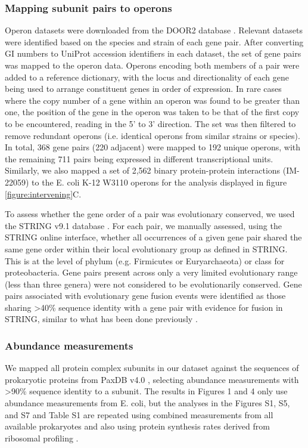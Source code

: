 \documentclass[a4paper,11pt,twoside,openright]{scrbook}
\begin{document}
\subsubsection{Mapping subunit pairs to operons}
Operon datasets were downloaded from the DOOR2 database \cite{Mao2014}. Relevant datasets were identified based on the species and strain of each gene pair. After converting GI numbers to UniProt accession identifiers in each dataset, the set of gene pairs was mapped to the operon data. Operons encoding both members of a pair were added to a reference dictionary, with the locus and directionality of each gene being used to arrange constituent genes in order of expression. In rare cases where the copy number of a gene within an operon was found to be greater than one, the position of the gene in the operon was taken to be that of the first copy to be encountered, reading in the 5' to 3' direction. The set was then filtered to remove redundant operons (i.e. identical operons from similar strains or species). In total, 368 gene pairs (220 adjacent) were mapped to 192 unique operons, with the remaining 711 pairs being expressed in different transcriptional units. Similarly, we also mapped a set of 2,562 binary protein-protein interactions (IM-22059) \cite{Rajagopala2014} to the E. coli K-12 W3110 operons for the analysis displayed in figure \ref{figure:intervening}C.

To assess whether the gene order of a pair was evolutionary conserved, we used the STRING v9.1 database \cite{Franceschini2013}. For each pair, we manually assessed, using the STRING online interface, whether all occurrences of a given gene pair shared the same gene order within their local evolutionary group as defined in STRING. This is at the level of phylum (e.g. Firmicutes or Euryarchaeota) or class for proteobacteria. Gene pairs present across only a very limited evolutionary range (less than three genera) were not considered to be evolutionarily conserved. Gene pairs associated with evolutionary gene fusion events were identified as those sharing >40\% sequence identity with a gene pair with evidence for fusion in STRING, similar to what has been done previously \cite{Marsh2013}.

\subsubsection{Abundance measurements}
We mapped all protein complex subunits in our dataset against the sequences of prokaryotic proteins from PaxDB v4.0 \cite{Wang2015}, selecting abundance measurements with >90\% sequence identity to a subunit. The results in Figures 1 and 4 only use abundance measurements from E. coli, but the analyses in the Figures S1, S5, and S7 and Table S1 are repeated using combined measurements from all available prokaryotes and also using protein synthesis rates derived from ribosomal profiling \cite{Li2014b}.
\end{document}
